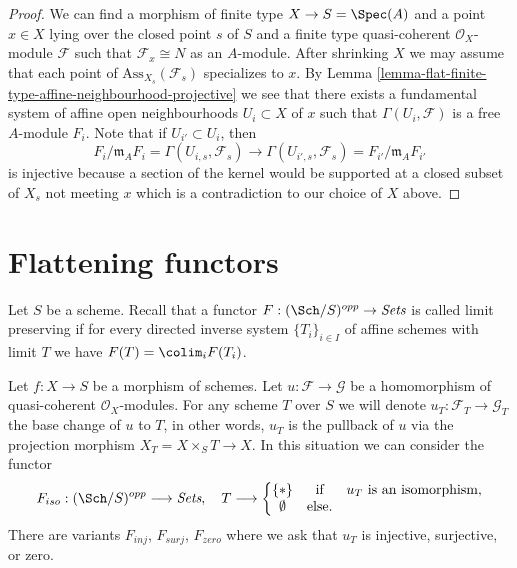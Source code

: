 \begin{proof}
We can find a morphism of finite type $X \to S = \Spec(A)$
and a point $x \in X$ lying over the closed point $s$ of $S$ and a finite
type quasi-coherent $\mathcal{O}_X$-module $\mathcal{F}$ such that
$\mathcal{F}_x \cong N$ as an $A$-module. After shrinking $X$
we may assume that each point of $\text{Ass}_{X_s}(\mathcal{F}_s)$ specializes
to $x$. By
Lemma \ref{lemma-flat-finite-type-affine-neighbourhood-projective}
we see that there exists a fundamental system of affine open neighbourhoods
$U_i \subset X$ of $x$ such that $\Gamma(U_i, \mathcal{F})$ is
a free $A$-module $F_i$. Note that if $U_{i'} \subset U_i$, then
$$
F_i/\mathfrak m_AF_i = \Gamma(U_{i, s}, \mathcal{F}_s)
\longrightarrow
\Gamma(U_{i', s}, \mathcal{F}_s) = F_{i'}/\mathfrak m_AF_{i'}
$$
is injective because a section of the kernel would be supported at
a closed subset of $X_s$ not meeting $x$ which is a contradiction
to our choice of $X$ above.
\end{proof}





\section{Flattening functors}
\label{section-flattening-functors}

\noindent
Let $S$ be a scheme. Recall that a functor
$F : (\Sch/S)^{opp} \to \textit{Sets}$ is called limit preserving
if for every directed inverse system
$\{T_i\}_{i \in I}$ of affine schemes with limit $T$ we have
$F(T) = \colim_i F(T_i)$.

\begin{situation}
\label{situation-iso}
Let $f : X \to S$ be a morphism of schemes.
Let $u : \mathcal{F} \to \mathcal{G}$ be a homomorphism of
quasi-coherent $\mathcal{O}_X$-modules. For any scheme $T$ over
$S$ we will denote $u_T : \mathcal{F}_T \to \mathcal{G}_T$ the
base change of $u$ to $T$, in other words, $u_T$ is the pullback
of $u$ via the projection morphism $X_T = X \times_S T \to X$.
In this situation we can consider the functor
\begin{equation}
\label{equation-iso}
F_{iso} : (\Sch/S)^{opp} \longrightarrow \textit{Sets}, \quad
T \longrightarrow \left\{
\begin{matrix}
\{*\} & \text{if} & u_T \text{ is an isomorphism}, \\
\emptyset & \text{else.} &
\end{matrix}
\right.
\end{equation}
There are variants $F_{inj}$, $F_{surj}$, $F_{zero}$ where we ask that
$u_T$ is injective, surjective, or zero.
\end{situation}


